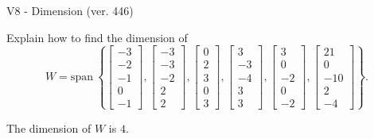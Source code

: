 \begin{exercise}
  \begin{exerciseTitle}V8 - Dimension (ver. 446)\end{exerciseTitle}
  \begin{exerciseStatement}
    Explain how to find the dimension of 
\[W=\mathrm{span}\ \left\{\left[\begin{array}{r}
-3 \\
-2 \\
-1 \\
0 \\
-1
\end{array}\right] , \left[\begin{array}{r}
-3 \\
-3 \\
-2 \\
2 \\
2
\end{array}\right] , \left[\begin{array}{r}
0 \\
2 \\
3 \\
0 \\
3
\end{array}\right] , \left[\begin{array}{r}
3 \\
-3 \\
-4 \\
3 \\
3
\end{array}\right] , \left[\begin{array}{r}
3 \\
0 \\
-2 \\
0 \\
-2
\end{array}\right] , \left[\begin{array}{r}
21 \\
0 \\
-10 \\
2 \\
-4
\end{array}\right]\right\}.\]



  \end{exerciseStatement}
  \begin{exerciseAnswer}
   The dimension of \(W\) is  \(4\).
  


  \end{exerciseAnswer}
\end{exercise}